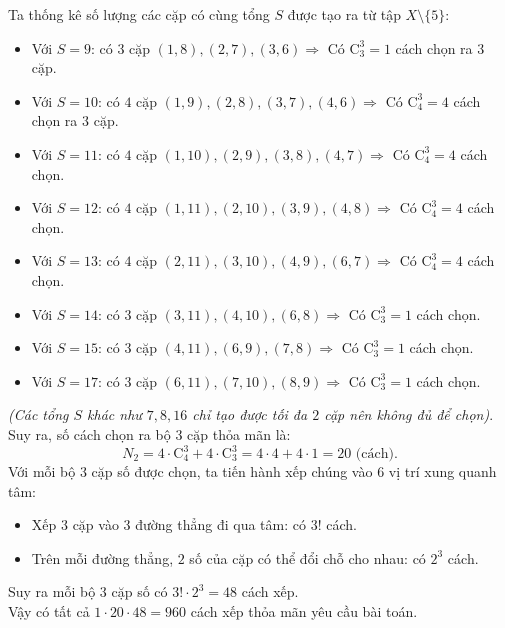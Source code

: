 \begin{ex}
{		Ta thống kê số lượng các cặp có cùng tổng $S$ được tạo ra từ tập $X \setminus \{5\}$:
		\begin{itemize}
			\item Với $S=9$: có $3$ cặp $(1,8), (2,7), (3,6) \Rightarrow$ Có $\mathrm{C}_3^3=1$ cách chọn ra $3$ cặp.
			\item Với $S=10$: có $4$ cặp $(1,9), (2,8), (3,7), (4,6) \Rightarrow$ Có $\mathrm{C}_4^3=4$ cách chọn ra $3$ cặp.
			\item Với $S=11$: có $4$ cặp $(1,10), (2,9), (3,8), (4,7) \Rightarrow$ Có $\mathrm{C}_4^3=4$ cách chọn.
			\item Với $S=12$: có $4$ cặp $(1,11), (2,10), (3,9), (4,8) \Rightarrow$ Có $\mathrm{C}_4^3=4$ cách chọn.
			\item Với $S=13$: có $4$ cặp $(2,11), (3,10), (4,9), (6,7) \Rightarrow$ Có $\mathrm{C}_4^3=4$ cách chọn.
			\item Với $S=14$: có $3$ cặp $(3,11), (4,10), (6,8) \Rightarrow$ Có $\mathrm{C}_3^3=1$ cách chọn.
			\item Với $S=15$: có $3$ cặp $(4,11), (6,9), (7,8) \Rightarrow$ Có $\mathrm{C}_3^3=1$ cách chọn.
			\item Với $S=17$: có $3$ cặp $(6,11), (7,10), (8,9) \Rightarrow$ Có $\mathrm{C}_3^3=1$ cách chọn.
		\end{itemize}
		\textit{(Các tổng $S$ khác như $7, 8, 16$ chỉ tạo được tối đa $2$ cặp nên không đủ để chọn)}.\\
		Suy ra, số cách chọn ra bộ $3$ cặp thỏa mãn là: 
		\[N_2 = 4 \cdot \mathrm{C}_4^3 + 4 \cdot \mathrm{C}_3^3 = 4 \cdot 4 + 4 \cdot 1 = 20 \text{ (cách)}.\]
		Với mỗi bộ $3$ cặp số được chọn, ta tiến hành xếp chúng vào $6$ vị trí xung quanh tâm:
		\begin{itemize}
			\item Xếp $3$ cặp vào $3$ đường thẳng đi qua tâm: có $3!$ cách.
			\item Trên mỗi đường thẳng, $2$ số của cặp có thể đổi chỗ cho nhau: có $2^3$ cách.
		\end{itemize}
		Suy ra mỗi bộ $3$ cặp số có $3! \cdot 2^3 = 48$ cách xếp.\\
		Vậy có tất cả $1 \cdot 20 \cdot 48 = 960$ cách xếp thỏa mãn yêu cầu bài toán.
	}
\end{ex}
\newpage
{}
\label{B\thedeso}